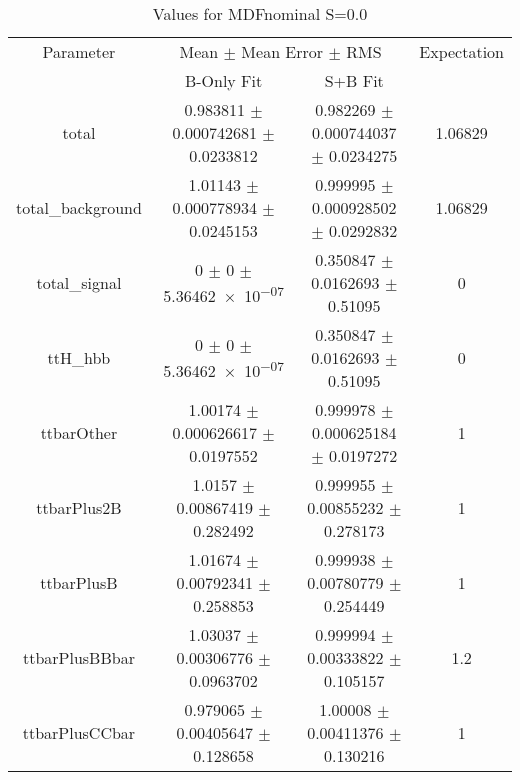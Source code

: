 \begin{table}
\centering
\caption{Values for MDFnominal S=0.0}
\begin{tabular}{cccc}
\toprule
Parameter & \multicolumn{2}{c}{Mean $\pm$ Mean Error $\pm$ RMS} & Expectation\\
 & B-Only Fit & S+B Fit & \\
\midrule
total & \num{0.983811} $\pm$ \num{0.000742681} $\pm$ \num{0.0233812} & \num{0.982269} $\pm$ \num{0.000744037} $\pm$ \num{0.0234275} & \num{1.06829}\\
total\_background & \num{1.01143} $\pm$ \num{0.000778934} $\pm$ \num{0.0245153} & \num{0.999995} $\pm$ \num{0.000928502} $\pm$ \num{0.0292832} & \num{1.06829}\\
total\_signal & \num{0} $\pm$ \num{0} $\pm$ \num{5.36462e-07} & \num{0.350847} $\pm$ \num{0.0162693} $\pm$ \num{0.51095} & \num{0}\\
ttH\_hbb & \num{0} $\pm$ \num{0} $\pm$ \num{5.36462e-07} & \num{0.350847} $\pm$ \num{0.0162693} $\pm$ \num{0.51095} & \num{0}\\
ttbarOther & \num{1.00174} $\pm$ \num{0.000626617} $\pm$ \num{0.0197552} & \num{0.999978} $\pm$ \num{0.000625184} $\pm$ \num{0.0197272} & \num{1}\\
ttbarPlus2B & \num{1.0157} $\pm$ \num{0.00867419} $\pm$ \num{0.282492} & \num{0.999955} $\pm$ \num{0.00855232} $\pm$ \num{0.278173} & \num{1}\\
ttbarPlusB & \num{1.01674} $\pm$ \num{0.00792341} $\pm$ \num{0.258853} & \num{0.999938} $\pm$ \num{0.00780779} $\pm$ \num{0.254449} & \num{1}\\
ttbarPlusBBbar & \num{1.03037} $\pm$ \num{0.00306776} $\pm$ \num{0.0963702} & \num{0.999994} $\pm$ \num{0.00333822} $\pm$ \num{0.105157} & \num{1.2}\\
ttbarPlusCCbar & \num{0.979065} $\pm$ \num{0.00405647} $\pm$ \num{0.128658} & \num{1.00008} $\pm$ \num{0.00411376} $\pm$ \num{0.130216} & \num{1}\\
\bottomrule
\end{tabular}
\end{table}